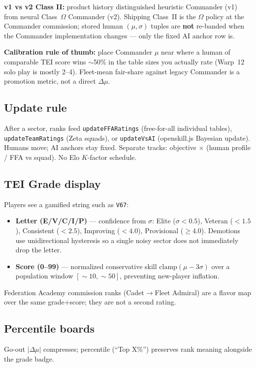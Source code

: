 \documentclass[11pt,letterpaper]{article}
\begin{document}
\textbf{v1 vs v2 Class II:} product history distinguished heuristic Commander (v1) from neural Class~$\Omega$ Commander (v2). Shipping Class~II is the $\Omega$ policy at the Commander commission; stored human $(\mu,\sigma)$ tuples are \textbf{not} re-banded when the Commander implementation changes --- only the fixed AI anchor row is.

\textbf{Calibration rule of thumb:} place Commander $\mu$ near where a human of comparable TEI score wins $\sim$50\% in the table sizes you actually rate (Warp~12 solo play is mostly 2--4). Fleet-mean fair-share against legacy Commander is a promotion metric, not a direct $\Delta\mu$.

\subsection{Update rule}
After a sector, ranks feed \texttt{updateFFARatings} (free-for-all individual tables), \texttt{updateTeamRatings} (Zeta squads), or \texttt{updateVsAI} (openskill.js Bayesian update). Humans move; AI anchors stay fixed. Separate tracks: objective $\times$ (human profile / FFA vs squad). No Elo $K$-factor schedule.

\subsection{TEI Grade display}
Players see a gamified string such as \texttt{V67}:
\begin{itemize}
\item \textbf{Letter (E/V/C/I/P)} --- confidence from $\sigma$: Elite ($\sigma<0.5$), Veteran ($<1.5$), Consistent ($<2.5$), Improving ($<4.0$), Provisional ($\geq 4.0$). Demotions use unidirectional hysteresis so a single noisy sector does not immediately drop the letter.
\item \textbf{Score (0--99)} --- normalized conservative skill $\mathrm{clamp}(\mu-3\sigma)$ over a population window $[\sim\!10,\sim\!50]$, preventing new-player inflation.
\end{itemize}
Federation Academy commission ranks (Cadet$\to$Fleet Admiral) are a flavor map over the same grade+score; they are not a second rating.

\subsection{Percentile boards}
Go-out $|\Delta\mu|$ compresses; percentile (``Top X\%'') preserves rank meaning alongside the grade badge.
\end{document}
